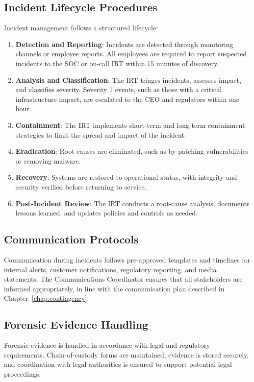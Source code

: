 \subsection{Incident Lifecycle Procedures}
Incident management follows a structured lifecycle:
\begin{enumerate}
  \item \textbf{Detection and Reporting}: Incidents are detected through monitoring channels or employee reports. All employees are required to report suspected incidents to the \ac{SOC} or on-call \ac{IRT} within 15 minutes of discovery.
  \item \textbf{Analysis and Classification}: The \ac{IRT} triages incidents, assesses impact, and classifies severity. Severity 1 events, such as those with a critical infrastructure impact, are escalated to the \ac{CEO} and regulators within one hour.
  \item \textbf{Containment}: The \Ac{IRT} implements short-term and long-term containment strategies to limit the spread and impact of the incident.
  \item \textbf{Eradication}: Root causes are eliminated, such as by patching vulnerabilities or removing malware.
  \item \textbf{Recovery}: Systems are restored to operational status, with integrity and security verified before returning to service.
  \item \textbf{Post-Incident Review}: The \ac{IRT} conducts a root-cause analysis, documents lessons learned, and updates policies and controls as needed.
\end{enumerate}

\subsection{Communication Protocols}
Communication during incidents follows pre-approved templates and timelines for internal alerts, customer notifications, regulatory reporting, and media statements. The Communications Coordinator ensures that all stakeholders are informed appropriately, in line with the communication plan described in Chapter~\ref{chap:contingency}.

\subsection{Forensic Evidence Handling}
Forensic evidence is handled in accordance with legal and regulatory requirements. Chain-of-custody forms are maintained, evidence is stored securely, and coordination with legal authorities is ensured to support potential legal proceedings.

